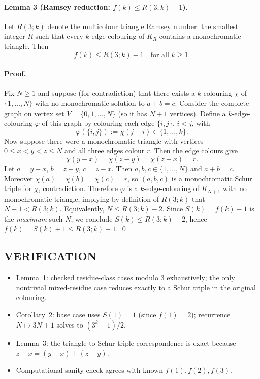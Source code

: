 \paragraph{Lemma 3 (Ramsey reduction: $f(k)\le R(3;k)-1$).}
Let $R(3;k)$ denote the multicolour triangle Ramsey number: the smallest integer $R$ such that every $k$-edge-colouring of $K_R$ contains a monochromatic triangle.
Then
\[f(k) \le R(3;k)-1\quad\text{for all }k\ge 1.
\]

\paragraph{Proof.}
Fix $N\ge 1$ and suppose (for contradiction) that there exists a $k$-colouring $\chi$ of $\{1,\dots,N\}$ with no monochromatic solution to $a+b=c$.
Consider the complete graph on vertex set $V=\{0,1,\dots,N\}$ (so it has $N+1$ vertices).
Define a $k$-edge-colouring $\varphi$ of this graph by colouring each edge $\{i,j\}$, $i<j$, with
\[\varphi(\{i,j\}) := \chi(j-i)\in\{1,\dots,k\}.
\]
Now suppose there were a monochromatic triangle with vertices $0\le x<y<z\le N$ and all three edges colour $r$.
Then the edge colours give
\[\chi(y-x)=\chi(z-y)=\chi(z-x)=r.
\]
Let $a=y-x$, $b=z-y$, $c=z-x$. Then $a,b,c\in\{1,\dots,N\}$ and $a+b=c$.
Moreover $\chi(a)=\chi(b)=\chi(c)=r$, so $(a,b,c)$ is a monochromatic Schur triple for $\chi$, contradiction.
Therefore $\varphi$ is a $k$-edge-colouring of $K_{N+1}$ with no monochromatic triangle, implying by definition of $R(3;k)$ that $N+1 < R(3;k)$.
Equivalently, $N \le R(3;k)-2$.
Since $S(k)=f(k)-1$ is the \emph{maximum} such $N$, we conclude $S(k)\le R(3;k)-2$, hence $f(k)=S(k)+1\le R(3;k)-1$.
\qed

\subsection*{VERIFICATION}
\begin{itemize}
\item Lemma~1: checked residue-class cases modulo $3$ exhaustively; the only nontrivial mixed-residue case reduces exactly to a Schur triple in the original colouring.
\item Corollary~2: base case uses $S(1)=1$ (since $f(1)=2$); recurrence $N\mapsto 3N+1$ solves to $(3^k-1)/2$.
\item Lemma~3: the triangle-to-Schur-triple correspondence is exact because $z-x=(y-x)+(z-y)$.
\item Computational sanity check agrees with known $f(1),f(2),f(3)$.
\end{itemize}

